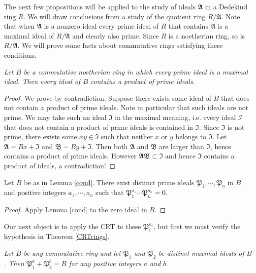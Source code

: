The next few propositions will be applied to the study of ideals $\mathfrak{A}$ in a Dedekind ring $R$. We will draw conclusions from a study of the quotient ring $R/\mathfrak{A}$. Note that when $\mathfrak{A}$ is a nonzero ideal every prime ideal of $R$ that contains $\mathfrak{A}$ is a maximal ideal of $R/\mathfrak{A}$ and clearly also prime. Since $R$ is a noetherian ring, so is $R/\mathfrak{A}$. We will prove some facts about commutative rings satisfying these conditions.
\begin{lemma}\em\label{cond}
Let $B$ be a commutative noetherian ring in which every prime ideal is a maximal ideal. Then every ideal of $B$ contains a product of prime ideals.
\end{lemma}
\begin{proof}
We prove by contradiction. Suppose there exists some ideal of $B$ that does not contain a product of prime ideals. Note in particular that such ideals are not prime.  We may take such an ideal $\mathfrak{I}$ in the maximal meaning, i.e. every ideal $\mathcal{I}$ that does not contain a product of prime ideals is contained in $\mathfrak{I}$. Since $\mathfrak{I}$ is not prime, there exists some $xy\in\mathfrak{I}$ such that neither $x$ or $y$ belongs to $\mathfrak{I}$. Let $\mathfrak{A}=Bx+\mathfrak{I}$ and $\mathfrak{B}=By+\mathfrak{I}$. Then both $\mathfrak{A}$ and $\mathfrak{B}$ are larger than $\mathfrak{I}$, hence contains a product of prime ideals. However $\mathfrak{A}\mathfrak{B}\subset\mathfrak{I}$ and hence $\mathfrak{I}$ contains a product of ideals, a contradiction!
\end{proof}
\begin{corollary}
Let $B$ be as in Lemma \ref{cond}. There exist distinct prime ideals $\mathfrak{P}_1,\cdots,\mathfrak{P}_n$ in $B$ and positive integers $a_1,\cdots,a_n$ such that $\mathfrak{P}_1^{a_1}\cdots\mathfrak{P}_n^{a_n}=0$.
\end{corollary}
\begin{proof}
Apply Lemma \ref{cond} to the zero ideal in $B$.
\end{proof}
Our next object is to apply the CRT to these $\mathfrak{P}_i^{a_i}$, but first we must verify the hypothesis in Theorem \ref{CRTrings}.
\begin{lemma}\em\label{PreOfCRT}
Let $B$ be any commutative ring and let $\mathfrak{P}_1$ and $\mathfrak{P}_2$ be distinct maximal ideals of $B$. Then $\mathfrak{P}_1^a+\mathfrak{P}_2^b=B$ for any positive integers $a$ and $b$.
\end{lemma}

